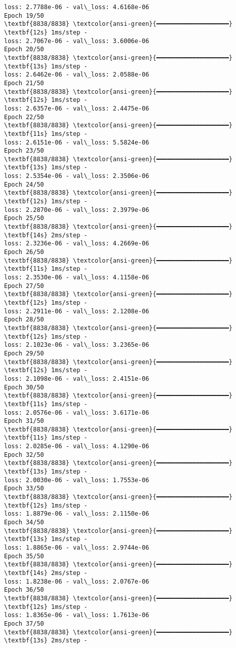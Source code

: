 \documentclass[11pt]{article}
\begin{document}
\begin{Verbatim}[commandchars=\\\{\}]
loss: 2.7788e-06 - val\_loss: 4.6168e-06
Epoch 19/50
\textbf{8838/8838} \textcolor{ansi-green}{━━━━━━━━━━━━━━━━━━━━} \textbf{12s} 1ms/step -
loss: 2.7067e-06 - val\_loss: 3.6006e-06
Epoch 20/50
\textbf{8838/8838} \textcolor{ansi-green}{━━━━━━━━━━━━━━━━━━━━} \textbf{13s} 1ms/step -
loss: 2.6462e-06 - val\_loss: 2.0588e-06
Epoch 21/50
\textbf{8838/8838} \textcolor{ansi-green}{━━━━━━━━━━━━━━━━━━━━} \textbf{12s} 1ms/step -
loss: 2.6357e-06 - val\_loss: 2.4475e-06
Epoch 22/50
\textbf{8838/8838} \textcolor{ansi-green}{━━━━━━━━━━━━━━━━━━━━} \textbf{11s} 1ms/step -
loss: 2.6151e-06 - val\_loss: 5.5824e-06
Epoch 23/50
\textbf{8838/8838} \textcolor{ansi-green}{━━━━━━━━━━━━━━━━━━━━} \textbf{13s} 1ms/step -
loss: 2.5354e-06 - val\_loss: 2.3506e-06
Epoch 24/50
\textbf{8838/8838} \textcolor{ansi-green}{━━━━━━━━━━━━━━━━━━━━} \textbf{12s} 1ms/step -
loss: 2.2870e-06 - val\_loss: 2.3979e-06
Epoch 25/50
\textbf{8838/8838} \textcolor{ansi-green}{━━━━━━━━━━━━━━━━━━━━} \textbf{14s} 2ms/step -
loss: 2.3236e-06 - val\_loss: 4.2669e-06
Epoch 26/50
\textbf{8838/8838} \textcolor{ansi-green}{━━━━━━━━━━━━━━━━━━━━} \textbf{11s} 1ms/step -
loss: 2.3530e-06 - val\_loss: 4.1158e-06
Epoch 27/50
\textbf{8838/8838} \textcolor{ansi-green}{━━━━━━━━━━━━━━━━━━━━} \textbf{12s} 1ms/step -
loss: 2.2911e-06 - val\_loss: 2.1208e-06
Epoch 28/50
\textbf{8838/8838} \textcolor{ansi-green}{━━━━━━━━━━━━━━━━━━━━} \textbf{12s} 1ms/step -
loss: 2.1023e-06 - val\_loss: 3.2365e-06
Epoch 29/50
\textbf{8838/8838} \textcolor{ansi-green}{━━━━━━━━━━━━━━━━━━━━} \textbf{12s} 1ms/step -
loss: 2.1098e-06 - val\_loss: 2.4151e-06
Epoch 30/50
\textbf{8838/8838} \textcolor{ansi-green}{━━━━━━━━━━━━━━━━━━━━} \textbf{11s} 1ms/step -
loss: 2.0576e-06 - val\_loss: 3.6171e-06
Epoch 31/50
\textbf{8838/8838} \textcolor{ansi-green}{━━━━━━━━━━━━━━━━━━━━} \textbf{11s} 1ms/step -
loss: 2.0285e-06 - val\_loss: 4.1290e-06
Epoch 32/50
\textbf{8838/8838} \textcolor{ansi-green}{━━━━━━━━━━━━━━━━━━━━} \textbf{13s} 1ms/step -
loss: 2.0030e-06 - val\_loss: 1.7553e-06
Epoch 33/50
\textbf{8838/8838} \textcolor{ansi-green}{━━━━━━━━━━━━━━━━━━━━} \textbf{12s} 1ms/step -
loss: 1.8879e-06 - val\_loss: 2.1150e-06
Epoch 34/50
\textbf{8838/8838} \textcolor{ansi-green}{━━━━━━━━━━━━━━━━━━━━} \textbf{13s} 1ms/step -
loss: 1.8865e-06 - val\_loss: 2.9744e-06
Epoch 35/50
\textbf{8838/8838} \textcolor{ansi-green}{━━━━━━━━━━━━━━━━━━━━} \textbf{14s} 2ms/step -
loss: 1.8238e-06 - val\_loss: 2.0767e-06
Epoch 36/50
\textbf{8838/8838} \textcolor{ansi-green}{━━━━━━━━━━━━━━━━━━━━} \textbf{12s} 1ms/step -
loss: 1.8365e-06 - val\_loss: 1.7613e-06
Epoch 37/50
\textbf{8838/8838} \textcolor{ansi-green}{━━━━━━━━━━━━━━━━━━━━} \textbf{13s} 2ms/step -

\end{Verbatim}
\end{document}
